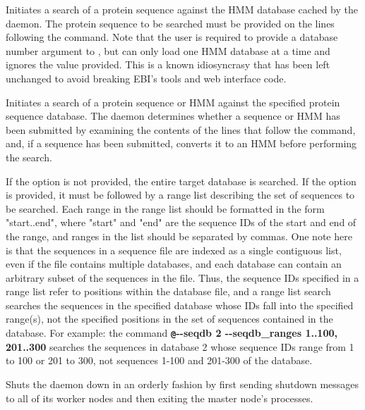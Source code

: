 \documentclass[notoc,justified]{tufte-book}    %
\begin{document}
\begin{sreitems}{}
  \item[\monob{@-{}-hmmdb <database \#>}]  Initiates a search of a protein sequence against the HMM database cached by the daemon.  The protein sequence to be searched must be provided on the lines following the  command.  Note that the user is required to provide a database number argument to , but  can only load one HMM database at a time and ignores the value provided.  This is a known idiosyncrasy that has been left unchanged to avoid breaking EBI's tools and web interface code.
  \item[\monob{@-{}-seqdb <database \#> [-{}-seqdb\_ranges <rangelist>]}] Initiates a search of a protein sequence or HMM against the specified protein sequence database.  The daemon determines whether a sequence or HMM has been submitted by examining the contents of the lines that follow the command, and, if a sequence has been submitted, converts it to an HMM before performing the search.

  If the  option is not provided, the entire target database is searched. If the  option is provided, it must be followed by a range list describing the set of sequences to be searched.  Each range in the range list should be formatted in the form "start..end", where "start" and "end" are the sequence IDs of the start and end of the range, and ranges in the list should be separated by commas. One note here is that the sequences in a sequence file are indexed as a single contiguous list, even if the file contains multiple databases, and each database can contain an arbitrary subset of the sequences in the file.  Thus, the sequence IDs specified in a range list refer to positions within the database file, and a range list search searches the sequences in the specified database whose IDs fall into the specified range(s), not the specified positions in the set of sequences contained in the database. For example: the command {\small\bfseries\texttt @-{}-seqdb 2 -{}-seqdb\_ranges 1..100, 201..300} searches the sequences in database 2 whose sequence IDs range from 1 to 100 or 201 to 300, not sequences 1-100 and 201-300 of the database.
  \item[\monob{!shutdown}] Shuts the daemon down in an orderly fashion by first sending shutdown messages to all of its worker nodes and then exiting the master node's processes.
\end{sreitems}
\end{document}
